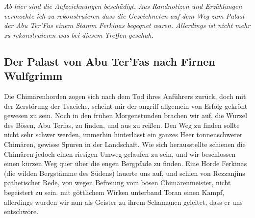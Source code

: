 \emph{Ab hier sind die Aufzeichnungen beschädigt. Aus Randnotizen und Erzählungen vermochte ich zu rekonstruieren dass die Gezeichneten auf dem Weg zum Palast der Abu Ter'Fas einem Stamm Ferkinas begegnet waren. Allerdings ist nicht mehr zu rekonstruieren was bei diesem Treffen geschah.}

\subsection{Der Palast von Abu Ter'Fas nach Firnen Wulfgrimm}

Die Chimärenhorden zogen sich nach dem Tod ihres Anführers zurück, doch mit der Zerstörung der Tsaeiche, scheint mir der angriff allgemein von Erfolg gekrönt gewesen zu sein. Noch in den frühen Morgenstunden brachen wir auf, die Wurzel des Bösen, Abu Terfas, zu finden, und aus zu reißen. Den Weg zu finden sollte nicht sehr schwer werden, immerhin hinterlässt ein ganzes Heer tonnenschwerer Chimären, gewisse Spuren in der Landschaft.
Wie sich herausstellte schienen die Chimären jedoch einen riesigen Umweg gelaufen zu sein, und wir beschlossen einen kürzen Weg quer über die engen Bergpfade zu finden.
Eine Horde Ferkinas (die wilden Bergstämme des Südens) lauerte uns auf, und schien von Rezzanjins pathetischer Rede, von wegen Befreiung vom bösen Chimärenmeister, nicht begeistert zu sein. mit göttlichem Wirken unterband Toran einen Kampf, allerdings wurden wir nun als Geister zu ihrem Schamanen geleitet, dass er uns entschwöre.
